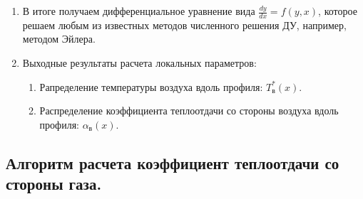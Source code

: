 \documentclass[a4paper,10pt]{article}
\begin{document}
\begin{enumerate}
        \item В итоге получаем дифференциальное уравнение вида $\frac{dy}{dx} = f(y, x)$, которое решаем любым из
        известных методов численного решения ДУ, например, методом Эйлера.

        \item Выходные результаты расчета локальных параметров:

        \begin{enumerate}
            \item Рапределение температуры воздуха вдоль профиля: $T_в^*(x)$.
            \item Распределение коэффициента теплоотдачи со стороны воздуха вдоль профиля: $\alpha_в (x)$.
        \end{enumerate}

    \end{enumerate}

%    

    \subsection{Алгоритм расчета коэффициент теплоотдачи со стороны газа.}
\end{document}

